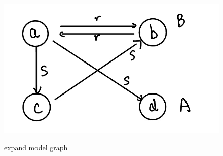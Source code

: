 \documentclass{article}
\begin{document}
    \begin{figure}[H]
        \centering
        \includegraphics[width=1\textwidth]{1.png}\\
        \caption{expand model graph}
        \label{fig:expand model graph}
    \end{figure}  
\end{document}
